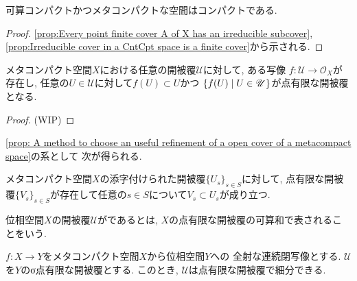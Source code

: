 \documentclass[uplatex, dvipdfmx, a4paper, 12pt, class=jsbook, crop=false]{standalone}
\begin{document}
\begin{proposition}
	\label{prop:CntCpt + MetaCpt > Cpt}
	可算コンパクトかつメタコンパクトな空間はコンパクトである.
\end{proposition}

\begin{proof} 
	\cref{prop:Every point finite cover A of X has an irreducible subcover}, 
	\cref{prop:Irreducible cover in a CntCpt space is a finite cover}から示される.
\end{proof}

\begin{proposition}
	\label{prop: A method to choose an useful refinement of a open cover of a metacompact space}
	メタコンパクト空間$ X $における任意の開被覆$ \mathscr{U} $に対して, ある写像
	$ f \colon \mathscr{U} \to \mathcal{O}_X $が存在し, 
	任意の$ U \in \mathscr{U} $に対して$ f(U) \subset U $かつ
	$ \setcomp{f(U)}{U \in \mathscr{U}} $が点有限な開被覆となる.
\end{proposition}

\begin{proof}
	(WIP)
\end{proof}

\cref{prop: A method to choose an useful refinement of a open cover of a metacompact space}の系として
次が得られる.
\begin{corollary}
	メタコンパクト空間$ X $の添字付けられた開被覆$ \{U_s\}_{s \in S} $に対して,
	点有限な開被覆$ \{V_s\}_{s \in S} $が存在して任意の$ s \in S $について$ V_s \subset U_s $が成り立つ.
\end{corollary}

\begin{definition}
	位相空間$ X $の開被覆$ \mathscr{U} $がであるとは, 
	$ X $の点有限な開被覆の可算和で表されることをいう.
\end{definition}

\begin{proposition}
	\label{prop: Every sigma-point-finite open covering of the closed image of a MetaCpt space has point a finite refinement}
	$ f \colon X \to Y $をメタコンパクト空間$ X $から位相空間$ Y $への
	全射な連続閉写像とする.
	$ \mathscr{U} $を$ Y $のσ点有限な開被覆とする.
	このとき, $ \mathscr{U} $は点有限な開被覆で細分できる.
\end{proposition}
\end{document}
